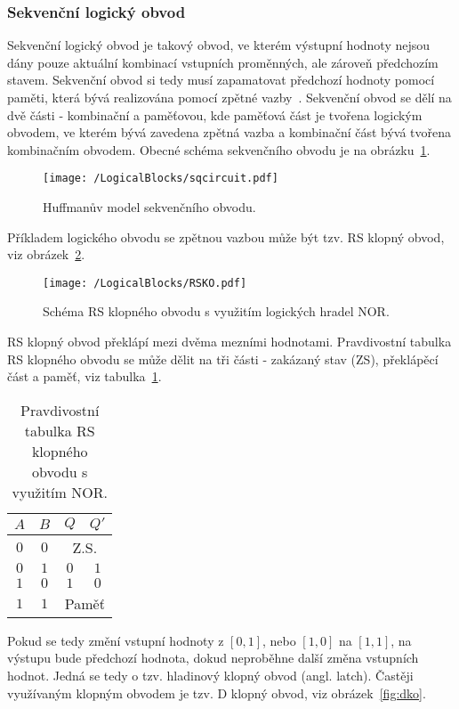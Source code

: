 \documentclass{report}
\begin{document}
\subsubsection{Sekvenční logický obvod}
Sekvenční logický obvod je takový obvod, ve kterém výstupní hodnoty nejsou dány pouze aktuální kombinací vstupních proměnných, ale zároveň předchozím stavem. Sekvenční obvod si tedy musí zapamatovat předchozí hodnoty pomocí paměti, která bývá realizována pomocí zpětné vazby~\cite{kubatova}. Sekvenční obvod se dělí na dvě části - kombinační a paměťovou, kde paměťová část je tvořena logickým obvodem, ve kterém bývá zavedena zpětná vazba a kombinační část bývá tvořena kombinačním obvodem. Obecné schéma sekvenčního obvodu je na obrázku~\ref{fig:seqcircuit}. \par
\begin{figure}
\centering
\texttt{[image: /LogicalBlocks/sqcircuit.pdf]}
\caption{Huffmanův model sekvenčního obvodu.}
\label{fig:seqcircuit}
\end{figure}
Příkladem logického obvodu se zpětnou vazbou může být tzv. RS klopný obvod, viz obrázek~\ref{fig:rsko}.
\begin{figure}
\centering
\texttt{[image: /LogicalBlocks/RSKO.pdf]}
\caption{Schéma RS klopného obvodu s využitím logických hradel NOR.}
\label{fig:rsko}
\end{figure}
RS klopný obvod překlápí mezi dvěma mezními hodnotami. Pravdivostní tabulka RS klopného obvodu se může dělit na tři části - zakázaný stav (ZS), překlápěcí část a paměť, viz tabulka~\ref{tab:rskotab}.
\begin{table}
\centering
 \begin{tabular}{ |c c|c c| } 
   	\hline
	$A$ & $B$ & $Q$ & $Q'$ \\
   	\hline
	$0$ & $0$ & \multicolumn{2}{c|}{Z.S.} \\
	$0$ & $1$ & $0$ & $1$\\
	$1$ & $0$ & $1$ & $0$\\
	$1$ & $1$ & \multicolumn{2}{c|}{Paměť}\\
   	\hline
\end{tabular}
	\caption{Pravdivostní tabulka RS klopného obvodu s využitím NOR.}
	\label{tab:rskotab}
\end{table}
Pokud se tedy změní vstupní hodnoty z $[0,1]$, nebo $[1,0]$ na $[1,1]$, na výstupu bude předchozí hodnota, dokud neproběhne další změna vstupních hodnot. Jedná se tedy o tzv. hladinový klopný obvod (angl. latch). Častěji využívaným klopným obvodem je tzv. D klopný obvod, viz obrázek~\ref{fig:dko}.
\end{document}
